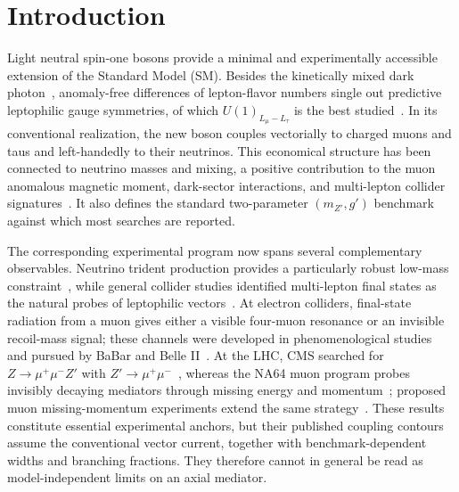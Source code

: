 \documentclass[onecolumn, aps, nofootinbib, prd, preprint, floats, floatfix, amsmath, amssymb, superscriptaddress, preprintnumbers]{revtex4-2}
\begin{document}
\makeatletter
\@booleanfalse\titlepage@sw
\@booleanfalse\preprintsty@sw
\makeatother
\maketitle
\makeatletter
\@booleantrue\preprintsty@sw
\makeatother
\tableofcontents

\section{Introduction}
\label{sec:introduction}

Light neutral spin-one bosons provide a minimal and experimentally accessible extension of the Standard Model (SM). Besides the kinetically mixed dark photon~\cite{Holdom:1985ag}, anomaly-free differences of lepton-flavor numbers single out predictive leptophilic gauge symmetries, of which $U(1)_{L_\mu-L_\tau}$ is the best studied~\cite{Foot:1990mn,He:1990pn,He:1991qd}. In its conventional realization, the new boson couples vectorially to charged muons and taus and left-handedly to their neutrinos. This economical structure has been connected to neutrino masses and mixing, a positive contribution to the muon anomalous magnetic moment, dark-sector interactions, and multi-lepton collider signatures~\cite{Baek:2001kca,Ma:2001md,Heeck:2011wj,Harigaya:2013twa,Altmannshofer:2014cfa,Crivellin:2015mga,Altmannshofer:2016brv}. It also defines the standard two-parameter $(m_{Z'},g')$ benchmark against which most searches are reported.

The corresponding experimental program now spans several complementary observables. Neutrino trident production provides a particularly robust low-mass constraint~\cite{Altmannshofer:2014pba}, while general collider studies identified multi-lepton final states as the natural probes of leptophilic vectors~\cite{delAguila:2014soa}. At electron colliders, final-state radiation from a muon gives either a visible four-muon resonance or an invisible recoil-mass signal; these channels were developed in phenomenological studies~\cite{Araki:2017wyg,Brown:2024jah} and pursued by BaBar and Belle II~\cite{BaBar:2016sci,Belle-II:2019qfb,Belle-II:2022yaw,Belle-II:2024wtd}. At the LHC, CMS searched for $Z\to\mu^+\mu^-Z'$ with $Z'\to\mu^+\mu^-$~\cite{CMS:2018yxg}, whereas the NA64 muon program probes invisibly decaying mediators through missing energy and momentum~\cite{NA64:2024klw}; proposed muon missing-momentum experiments extend the same strategy~\cite{Kahn:2018cqs}. These results constitute essential experimental anchors, but their published coupling contours assume the conventional vector current, together with benchmark-dependent widths and branching fractions. They therefore cannot in general be read as model-independent limits on an axial mediator.
\end{document}
